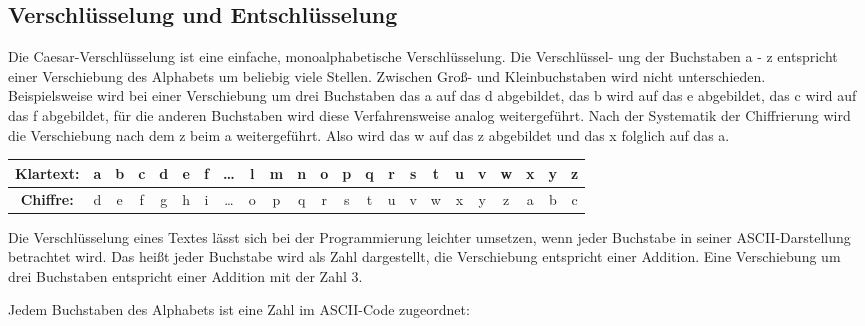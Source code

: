 \documentclass[ngerman,12pt]{article}
\begin{document}
\subsection*{Verschlüsselung und Entschlüsselung}
Die Caesar-Verschlüsselung ist eine einfache, monoalphabetische Verschlüsselung. Die Verschlüssel- ung der Buchstaben a - z entspricht einer Verschiebung des Alphabets um beliebig viele Stellen. Zwischen Groß- und Kleinbuchstaben wird nicht unterschieden.\cite{Beutelspacher2007}\\ 
Beispielsweise wird bei einer Verschiebung um drei Buchstaben das a auf das d abgebildet, das b wird auf das e abgebildet, das c wird auf das f abgebildet, für die anderen Buchstaben wird diese Verfahrensweise analog weitergeführt. Nach der Systematik der Chiffrierung wird die Verschiebung nach dem z beim a weitergeführt. Also wird das w auf das z abgebildet und das x folglich auf das a.

\begin{table}[ht]
\centering
\label{table:bspaisd}
\begin{tabular}{*{23}{|c}|}
	\hline
	\textbf{Klartext:} & a & b & c & d & e & f & \dots & l & m & n & o & p & q & r & s & t & u & v & w & x & y & z \\
	\hline
	\textbf{Chiffre:} & d & e & f & g & h & i & \dots & o & p & q & r & s & t & u & v & w & x & y & z & a & b & c \\
	\hline
	
\end{tabular}
\end{table}

Die Verschlüsselung eines Textes lässt sich bei der Programmierung leichter umsetzen, wenn jeder Buchstabe in seiner ASCII-Darstellung betrachtet wird. Das heißt jeder Buchstabe wird als Zahl dargestellt, die Verschiebung entspricht einer Addition. Eine Verschiebung um drei Buchstaben entspricht einer Addition mit der Zahl 3.

\newpage

Jedem Buchstaben des Alphabets ist eine Zahl im ASCII-Code zugeordnet:
\end{document}
